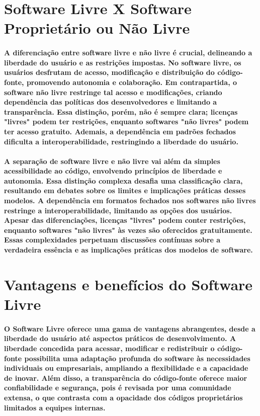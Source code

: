 \documentclass[a4paper, 12pt]{article}
\begin{document}
\section{Software Livre X Software Proprietário ou Não Livre}
\paragraph{A diferenciação entre software livre e não livre é crucial, delineando a liberdade do usuário e as restrições impostas. No software livre, os usuários desfrutam de acesso, modificação e distribuição do código-fonte, promovendo autonomia e colaboração. Em contrapartida, o software não livre restringe tal acesso e modificações, criando dependência das políticas dos desenvolvedores e limitando a transparência. Essa distinção, porém, não é sempre clara; licenças "livres" podem ter restrições, enquanto softwares "não livres" podem ter acesso gratuito. Ademais, a dependência em padrões fechados dificulta a interoperabilidade, restringindo a liberdade do usuário.}
\paragraph{A separação de software livre e não livre vai além da simples acessibilidade ao código, envolvendo princípios de liberdade e autonomia. Essa distinção complexa desafia uma classificação clara, resultando em debates sobre os limites e implicações práticas desses modelos. A dependência em formatos fechados nos softwares não livres restringe a interoperabilidade, limitando as opções dos usuários. Apesar das diferenciações, licenças "livres" podem conter restrições, enquanto softwares "não livres" às vezes são oferecidos gratuitamente. Essas complexidades perpetuam discussões contínuas sobre a verdadeira essência e as implicações práticas dos modelos de software.}

\section{Vantagens e benefícios do Software Livre}
\paragraph{O Software Livre oferece uma gama de vantagens abrangentes, desde a liberdade do usuário até aspectos práticos de desenvolvimento. A liberdade concedida para acessar, modificar e redistribuir o código-fonte possibilita uma adaptação profunda do software às necessidades individuais ou empresariais, ampliando a flexibilidade e a capacidade de inovar. Além disso, a transparência do código-fonte oferece maior confiabilidade e segurança, pois é revisada por uma comunidade extensa, o que contrasta com a opacidade dos códigos proprietários limitados a equipes internas.}
\end{document}
